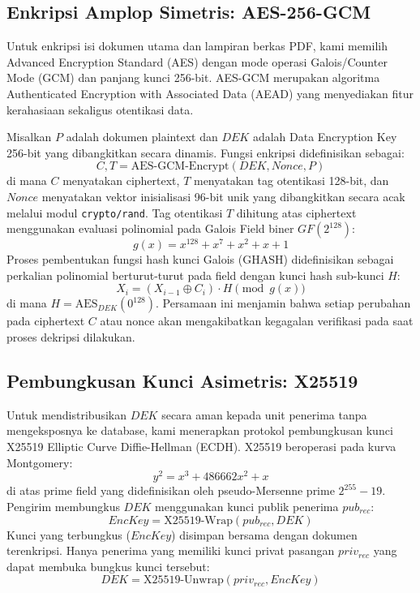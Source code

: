 \documentclass[conference]{IEEEtran}
\begin{document}
\subsection{Enkripsi Amplop Simetris: AES-256-GCM}
Untuk enkripsi isi dokumen utama dan lampiran berkas PDF, kami memilih Advanced Encryption Standard (AES) dengan mode operasi Galois/Counter Mode (GCM) dan panjang kunci 256-bit. AES-GCM merupakan algoritma Authenticated Encryption with Associated Data (AEAD) yang menyediakan fitur kerahasiaan sekaligus otentikasi data.

Misalkan $P$ adalah dokumen plaintext dan $DEK$ adalah Data Encryption Key 256-bit yang dibangkitkan secara dinamis. Fungsi enkripsi didefinisikan sebagai:
\begin{equation}
C, T = \text{AES-GCM-Encrypt}(DEK, Nonce, P)
\end{equation}
di mana $C$ menyatakan ciphertext, $T$ menyatakan tag otentikasi 128-bit, dan $Nonce$ menyatakan vektor inisialisasi 96-bit unik yang dibangkitkan secara acak melalui modul \texttt{crypto/rand}. Tag otentikasi $T$ dihitung atas ciphertext menggunakan evaluasi polinomial pada Galois Field biner $GF(2^{128})$:
\begin{equation}
g(x) = x^{128} + x^7 + x^2 + x + 1
\end{equation}
Proses pembentukan fungsi hash kunci Galois (GHASH) didefinisikan sebagai perkalian polinomial berturut-turut pada field dengan kunci hash sub-kunci $H$:
\begin{equation}
X_i = (X_{i-1} \oplus C_i) \cdot H \pmod{g(x)}
\end{equation}
di mana $H = \text{AES}_{DEK}(0^{128})$. Persamaan ini menjamin bahwa setiap perubahan pada ciphertext $C$ atau nonce akan mengakibatkan kegagalan verifikasi pada saat proses dekripsi dilakukan.

\subsection{Pembungkusan Kunci Asimetris: X25519}
Untuk mendistribusikan $DEK$ secara aman kepada unit penerima tanpa mengeksposnya ke database, kami menerapkan protokol pembungkusan kunci X25519 Elliptic Curve Diffie-Hellman (ECDH).
X25519 beroperasi pada kurva Montgomery:
\begin{equation}
y^2 = x^3 + 486662x^2 + x
\end{equation}
di atas prime field yang didefinisikan oleh pseudo-Mersenne prime $2^{255} - 19$.
Pengirim membungkus $DEK$ menggunakan kunci publik penerima $pub_{rec}$:
\begin{equation}
EncKey = \text{X25519-Wrap}(pub_{rec}, DEK)
\end{equation}
Kunci yang terbungkus ($EncKey$) disimpan bersama dengan dokumen terenkripsi. Hanya penerima yang memiliki kunci privat pasangan $priv_{rec}$ yang dapat membuka bungkus kunci tersebut:
\begin{equation}
DEK = \text{X25519-Unwrap}(priv_{rec}, EncKey)
\end{equation}
\end{document}

